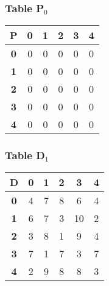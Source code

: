 \documentclass{beamer}
\begin{document}
\begin{frame}
\frametitle{Table P$_{0}$}
\begin{center}
    \begin{tabular}{|c||c|c|c|c|c|}
        \hline
        \textbf{P} & \textbf{0} & \textbf{1} & \textbf{2} & \textbf{3} & \textbf{4} \\
        \hline
        \hline
        \textbf{0}& 0 & 0 & 0 & 0 & 0 \\
        \hline
        \textbf{1}& 0 & 0 & 0 & 0 & 0 \\
        \hline
        \textbf{2}& 0 & 0 & 0 & 0 & 0 \\
        \hline
        \textbf{3}& 0 & 0 & 0 & 0 & 0 \\
        \hline
        \textbf{4}& 0 & 0 & 0 & 0 & 0 \\
        \hline
    \end{tabular}
\end{center}


\end{frame}


\begin{frame}
\frametitle{Table D$_{1}$}
\begin{center}
    \begin{tabular}{|c||c|c|c|c|c|}
        \hline
        \textbf{D} & \textbf{0} & \textbf{1} & \textbf{2} & \textbf{3} & \textbf{4} \\
        \hline
        \hline
        \textbf{0}& 4 & 7 & 8 & 6 & 4 \\
        \hline
        \textbf{1}& 6 & 7 & 3 & 10 & 2 \\
        \hline
        \textbf{2}& 3 & 8 & 1 & \cellcolor{yellow}9 & 4 \\
        \hline
        \textbf{3}& 7 & 1 & 7 & 3 & 7 \\
        \hline
        \textbf{4}& 2 & 9 & 8 & \cellcolor{yellow}8 & 3 \\
        \hline
    \end{tabular}
\end{center}


\end{frame}
\end{document}
